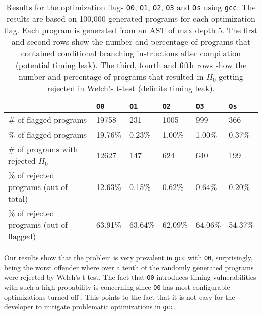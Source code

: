 \begin{table}[H]
  \centering
  \begin{tabular}{l|lllll}
                                           & \textbf{\texttt{O0}} & \textbf{\texttt{O1}} & \textbf{\texttt{O2}} & \textbf{\texttt{O3}} & \textbf{\texttt{Os}} \\ \hline
  \# of flagged programs                   & 19758                                 & 231                                   & 1005                                  & 999                                   & 366                                   \\
  \% of flagged programs                   & 19.76\%                               & 0.23\%                                & 1.00\%                                & 1.00\%                                & 0.37\%                                \\
  \# of programs with rejected $H_0$       & 12627                                 & 147                                   & 624                                   & 640                                   & 199                                   \\
  \% of rejected programs (out of total)   & 12.63\%                               & 0.15\%                                & 0.62\%                                & 0.64\%                                & 0.20\%                                \\
  \% of rejected programs (out of flagged) & 63.91\%                               & 63.64\%                               & 62.09\%                               & 64.06\%                               & 54.37\%                              
  \end{tabular}
  \caption{Results for the optimization flags \texttt{O0}, \texttt{O1}, \texttt{O2}, \texttt{O3} and \texttt{Os} using \texttt{gcc}. 
  The results are based on 100,000 generated programs for each optimization flag. 
  Each program is generated from an AST of max depth 5.
  The first and second rows show the number and percentage of programs that contained conditional branching instructions after compilation (potential timing leak).
  The third, fourth and fifth rows show the number and percentage of programs that resulted in $H_0$ getting rejected in Welch's t-test (definite timing leak).}
  \label{tab:general-optimizations}
\end{table}
Our results show that the problem is very prevalent in \texttt{gcc} with \texttt{O0}, surprisingly, being the worst offender where over a tenth of the randomly generated programs were rejected by Welch's t-test. 
The fact that \texttt{O0} introduces timing vulnerabilities with such a high probability is concerning since \texttt{O0} has most configurable optimizations turned off \citep{gcc-manual}.
This points to the fact that it is not easy for the developer to mitigate problematic optimizations in \texttt{gcc}.

